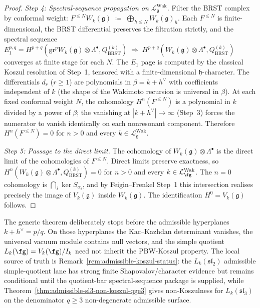 \begin{proof}
\emph{Step 4: Spectral-sequence propagation on
$\mathcal{L}^{\mathrm{Wak}}_{\mathfrak{g}}$.}
Filter the BRST complex by conformal weight:
\(
F^{\leq N} W_k(\mathfrak{g})
\;\coloneqq\;
\bigoplus_{h\leq N} W_k(\mathfrak{g})_h.
\)
Each $F^{\leq N}$ is finite-dimensional, the BRST differential
preserves the filtration strictly, and the spectral sequence
\(
E_1^{p,q} = H^{p+q}(\mathrm{gr}^p W_k(\mathfrak{g})\otimes
\Lambda^\bullet, Q_{\mathrm{BRST}}^{(k)})
\;\Longrightarrow\;
H^{p+q}(W_k(\mathfrak{g})\otimes\Lambda^\bullet,
Q_{\mathrm{BRST}}^{(k)})
\)
converges at finite stage for each $N$. The $E_1$ page is computed
by the classical Koszul resolution of Step~1, tensored with a
finite-dimensional $\mathfrak{h}$-character. The differentials
$d_r$ ($r\geq 1$) are polynomials in $\beta = k + h^\vee$ with
coefficients independent of $k$ (the shape of the Wakimoto
recursion is universal in $\beta$). At each fixed conformal weight
$N$, the cohomology $H^n(F^{\leq N})$ is a polynomial in $k$
divided by a power of $\beta$; the vanishing at
$|k+h^\vee|\to\infty$ (Step~3) forces the numerator to vanish
identically on each nonresonant component. Therefore
$H^n(F^{\leq N}) = 0$ for $n>0$ and every
$k\in\mathcal{L}^{\mathrm{Wak}}_{\mathfrak{g}}$.

\emph{Step 5: Passage to the direct limit.}
The cohomology of $W_k(\mathfrak{g})\otimes\Lambda^\bullet$ is the
direct limit of the cohomologies of $F^{\leq N}$. Direct limits
preserve exactness, so
$H^n(W_k(\mathfrak{g})\otimes\Lambda^\bullet, Q_{\mathrm{BRST}}^{(k)}) = 0$
for $n>0$ and every $k\in\mathcal L^{\mathrm{Wak}}_{\fg}$.
The $n = 0$ cohomology is
$\bigcap_i \ker S_{\alpha_i}$, and by Feigin--Frenkel Step~1 this
intersection realises precisely the image of $V_k(\mathfrak{g})$
inside $W_k(\mathfrak{g})$. The identification
$H^0 = V_k(\mathfrak{g})$ follows.
\end{proof}

\begin{remark}
\label{rem:wakimoto-admissible-robust}
The generic theorem deliberately stops before the admissible
hyperplanes $k+h^\vee=p/q$. On those hyperplanes the
Kac--Kazhdan determinant vanishes, the universal vacuum module
contains null vectors, and the simple quotient
$L_k(\fg)=V_k(\fg)/I_k$ need not inherit the PBW-Koszul property.
The local source of truth is
Remark~\ref{rem:admissible-koszul-status}: the
$L_k(\mathfrak{sl}_2)$ admissible simple-quotient lane has strong
finite Shapovalov/character evidence but remains conditional until the
quotient-bar spectral-sequence package is supplied, while
Theorem~\ref{thm:admissible-sl3-non-koszul-qge3} gives
non-Koszulness for $L_k(\mathfrak{sl}_3)$ on the denominator
$q\geq 3$ non-degenerate admissible surface.
\end{remark}

